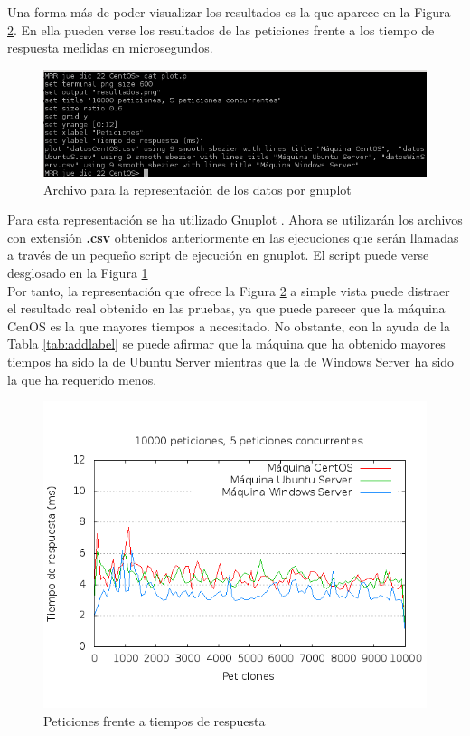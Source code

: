 Una forma más de poder visualizar los resultados es la que aparece en la Figura \ref{fig:res}. En ella pueden verse los resultados de las peticiones frente a los tiempo de respuesta medidas en microsegundos.

\begin{figure}[H] %
	\centering
	\includegraphics[scale=0.8]{figuras/ejercicio3/archivoPlot.png} 
	\caption{Archivo para la representación de los datos por gnuplot} 
	\label{fig:plot}
\end{figure}

Para esta representación se ha utilizado Gnuplot \cite{enlace6}. Ahora se utilizarán los archivos con extensión \textbf{.csv} obtenidos anteriormente en las ejecuciones que serán llamadas a través de un pequeño script de ejecución en gnuplot.
El script puede verse desglosado en la Figura \ref{fig:plot}
\\

Por tanto, la representación que ofrece la Figura \ref{fig:res} a simple vista puede distraer el resultado real obtenido en las pruebas, ya que puede parecer que la máquina CenOS es la que mayores tiempos a necesitado. No obstante, con la ayuda de la Tabla \ref{tab:addlabel} se puede afirmar que la máquina que ha obtenido mayores tiempos ha sido la de Ubuntu Server mientras que la de Windows Server ha sido la que ha requerido menos.

\begin{figure}[H] %
	\centering
	\includegraphics[scale=0.7]{calc/resultados.png} 
	\caption{Peticiones frente a tiempos de respuesta} 
	\label{fig:res}
\end{figure}

